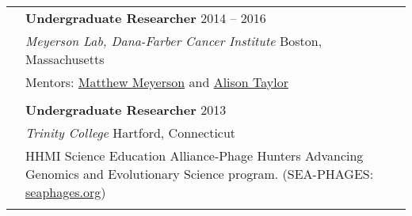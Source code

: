 \documentclass[letterpaper, 11pt]{article}
\begin{document}
\begin{longtable}{p{1.6in}p{4.9in}}
\pagebreak

& \textbf{Undergraduate Researcher} \hfill 2014 -- 2016\\
& \textit{Meyerson Lab, Dana-Farber Cancer Institute}  \hfill Boston, Massachusetts\\
& Mentors: \href{https://meyersonlab.dana-farber.org/matthew-meyerson.html}{Matthew Meyerson} and 
\href{https://www.cancer.columbia.edu/profile/alison-taylor-phd}{Alison Taylor}  \\
& \\

& \textbf{Undergraduate Researcher} \hfill 2013 \\
& \textit{Trinity College} \hfill Hartford, Connecticut \\
& HHMI Science Education Alliance-Phage Hunters Advancing Genomics and Evolutionary Science program. 
(SEA-PHAGES: \href{https://seaphages.org/}{seaphages.org}) \\
& \\


\end{longtable} %

{} 
\begin{paracol}{2}
  \switchcolumn
  \nocite{*} 
  \printbibliography[heading=none, keyword=published]
\end{paracol}

{} 
\begin{paracol}{2}
  \switchcolumn
  \nocite{*} 
  \printbibliography[heading=none, keyword=preprint]
\end{paracol}


\setlength{\tabcolsep}{8pt}
\end{document}
